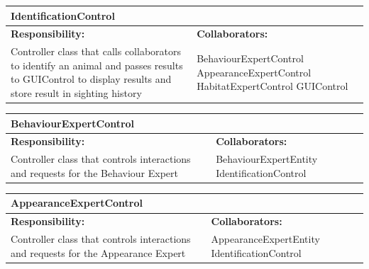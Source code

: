 \documentclass[]{article}
\begin{document}
%
\begin{table}[H]
	\centering
	\begin{tabular}{|p{5cm}|p{5cm}|}
		\hline
		\multicolumn{2}{|l|}{\textbf{IdentificationControl}} \\
		\hline
		\textbf{Responsibility:} & \textbf{Collaborators:} \\
		\hline
		 Controller class that calls collaborators to identify an animal and passes results to GUIControl to display results and store result in sighting history & BehaviourExpertControl \break AppearanceExpertControl \break HabitatExpertControl \break GUIControl\\
		\hline
	\end{tabular}
\end{table}
\begin{table}[H]
	\centering
	\begin{tabular}{|p{5cm}|p{5cm}|}
		\hline
		\multicolumn{2}{|l|}{\textbf{BehaviourExpertControl}} \\
		\hline
		\textbf{Responsibility:} & \textbf{Collaborators:} \\
		\hline
		 Controller class that controls interactions and requests for the Behaviour Expert & BehaviourExpertEntity \break IdentificationControl\\
		\hline
	\end{tabular}
\end{table}
\begin{table}[H]
	\centering
	\begin{tabular}{|p{5cm}|p{5cm}|}
		\hline
		\multicolumn{2}{|l|}{\textbf{AppearanceExpertControl}} \\
		\hline
		\textbf{Responsibility:} & \textbf{Collaborators:} \\
		\hline
		 Controller class that controls interactions and requests for the Appearance Expert & AppearanceExpertEntity \break IdentificationControl\\
\hline
	\end{tabular}
\end{table}
\end{document}
